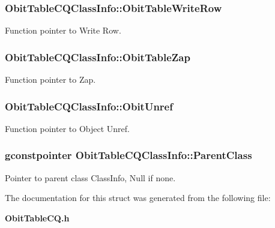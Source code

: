\subsubsection{ {\bf Obit\-Table\-CQClass\-Info::Obit\-Table\-Write\-Row}}\label{structObitTableCQClassInfo_o26}


Function pointer to Write Row. 

\subsubsection{ {\bf Obit\-Table\-CQClass\-Info::Obit\-Table\-Zap}}\label{structObitTableCQClassInfo_o19}


Function pointer to Zap. 

\subsubsection{ {\bf Obit\-Table\-CQClass\-Info::Obit\-Unref}}\label{structObitTableCQClassInfo_o11}


Function pointer to Object Unref. 

\subsubsection{\setlength{\rightskip}{0pt plus 5cm}gconstpointer {\bf Obit\-Table\-CQClass\-Info::Parent\-Class}}\label{structObitTableCQClassInfo_o3}


Pointer to parent class Class\-Info, Null if none. 



The documentation for this struct was generated from the following file:\begin{CompactItemize}
\item 
{\bf Obit\-Table\-CQ.h}\end{CompactItemize}

